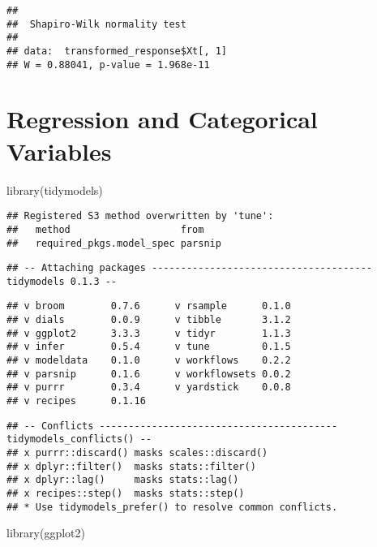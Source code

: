 \documentclass[
]{book}
\newenvironment{Shaded}{\begin{snugshade}}{\end{snugshade}}
\newcommand{\FunctionTok}[1]{\textcolor[rgb]{0.00,0.00,0.00}{#1}}
\newcommand{\NormalTok}[1]{#1}
\begin{document}
\begin{verbatim}
## 
##  Shapiro-Wilk normality test
## 
## data:  transformed_response$Xt[, 1]
## W = 0.88041, p-value = 1.968e-11
\end{verbatim}

\hypertarget{regression-and-categorical-variables}{%
\section{Regression and Categorical Variables}\label{regression-and-categorical-variables}}

\begin{Shaded}
\begin{Highlighting}[]
\FunctionTok{library}\NormalTok{(tidymodels)}
\end{Highlighting}
\end{Shaded}

\begin{verbatim}
## Registered S3 method overwritten by 'tune':
##   method                   from   
##   required_pkgs.model_spec parsnip
\end{verbatim}

\begin{verbatim}
## -- Attaching packages -------------------------------------- tidymodels 0.1.3 --
\end{verbatim}

\begin{verbatim}
## v broom        0.7.6      v rsample      0.1.0 
## v dials        0.0.9      v tibble       3.1.2 
## v ggplot2      3.3.3      v tidyr        1.1.3 
## v infer        0.5.4      v tune         0.1.5 
## v modeldata    0.1.0      v workflows    0.2.2 
## v parsnip      0.1.6      v workflowsets 0.0.2 
## v purrr        0.3.4      v yardstick    0.0.8 
## v recipes      0.1.16
\end{verbatim}

\begin{verbatim}
## -- Conflicts ----------------------------------------- tidymodels_conflicts() --
## x purrr::discard() masks scales::discard()
## x dplyr::filter()  masks stats::filter()
## x dplyr::lag()     masks stats::lag()
## x recipes::step()  masks stats::step()
## * Use tidymodels_prefer() to resolve common conflicts.
\end{verbatim}

\begin{Shaded}
\begin{Highlighting}[]
\FunctionTok{library}\NormalTok{(ggplot2)}
\end{Highlighting}
\end{Shaded}
\end{document}
